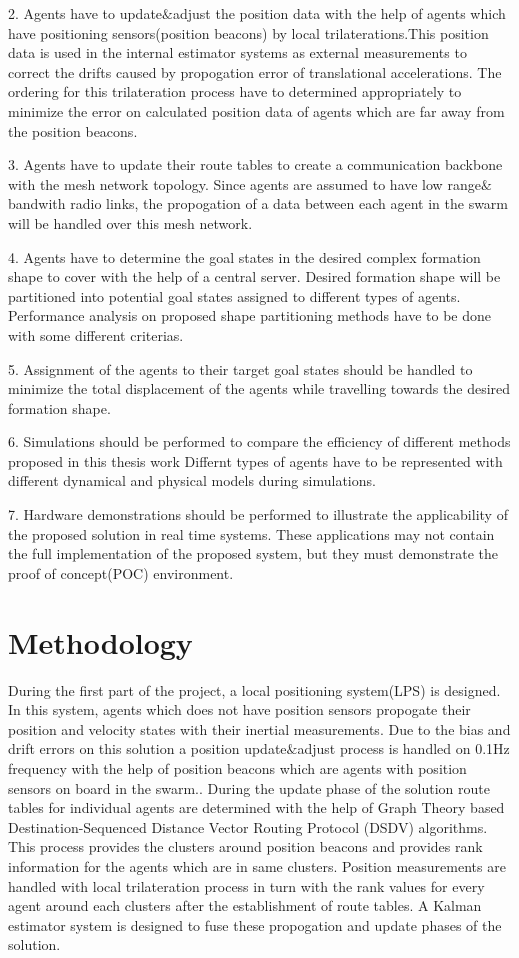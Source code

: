 2. Agents have to update$\&$adjust the position data with the help of agents which have positioning sensors(position beacons) by local trilaterations.This position data is used in the internal estimator systems as external measurements to correct the drifts caused by propogation error of translational accelerations.  The ordering for this trilateration process have to determined appropriately to minimize the error on calculated position data of agents which are far away from the position beacons.

3. Agents have to update their route tables to create a communication backbone with the mesh network topology. Since agents are assumed to have low range$\&$bandwith radio links, the propogation of a data between each agent in the swarm will be handled over this mesh network. 

4. Agents have to determine the goal states in the desired complex formation shape to cover with the help of a central server. Desired formation shape will be partitioned into potential goal states assigned to different types of agents. Performance analysis on proposed shape partitioning methods have to be done with some different criterias. 

5. Assignment of the agents to their target goal states should be handled to minimize the total displacement of the agents while travelling towards the desired formation shape. 

6. Simulations should be performed to compare the efficiency of different methods proposed in this thesis work   Differnt types of agents have to be represented with different dynamical and physical models during simulations.

7. Hardware demonstrations should be performed to illustrate the applicability of the proposed solution in real time systems. These applications may not contain the full implementation of the proposed system, but they must demonstrate the proof of concept(POC) environment. 


\section{Methodology}

During the first part of the project, a local positioning system(LPS) is designed. In this system, agents which does not have position sensors propogate their position and velocity states with their inertial measurements. Due to the bias and drift errors on this solution a position update$\&$adjust process is handled on 0.1Hz frequency with the help of position beacons which are agents with position sensors on board in the swarm.. During the update phase of the solution route tables for individual agents are determined with the help of Graph Theory based Destination-Sequenced Distance Vector Routing Protocol (DSDV) algorithms. This process provides the clusters around position beacons and provides rank information for the agents which are in same clusters. Position measurements are handled with local trilateration process in turn with the rank values for every agent around each clusters after the establishment of route tables. A Kalman estimator system is designed to fuse these propogation and update phases of the solution.

